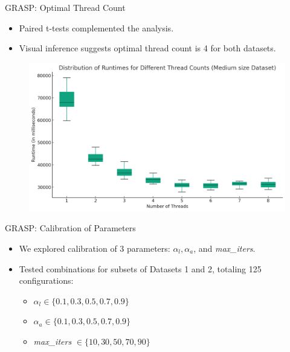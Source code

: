 \documentclass{beamer}
\begin{document}
\begin{frame}{GRASP: Optimal Thread Count}
    \begin{itemize}
        \item Paired t-tests complemented the analysis.
        \item Visual inference suggests optimal thread count is 4 for both datasets.
    \end{itemize}
    \begin{figure}
        \centering
        \includegraphics[scale=0.4]{boxplot_medium.png}
    \end{figure}
\end{frame}

\begin{frame}{GRASP: Calibration of Parameters}
    \begin{itemize}
        \item We explored calibration of 3 parameters: $\alpha_l, \alpha_a$, and \textit{max\_iters}.
        \item Tested combinations for subsets of Datasets 1 and 2, totaling 125 configurations:
        \begin{itemize}
            \item $\alpha_l \in \{0.1, 0.3, 0.5, 0.7, 0.9\}$
            \item $\alpha_a \in \{0.1, 0.3, 0.5, 0.7, 0.9\}$
            \item \textit{max\_iters} $\in \{10, 30, 50, 70, 90\}$
        \end{itemize}
    \end{itemize}
\end{frame}
\end{document}
